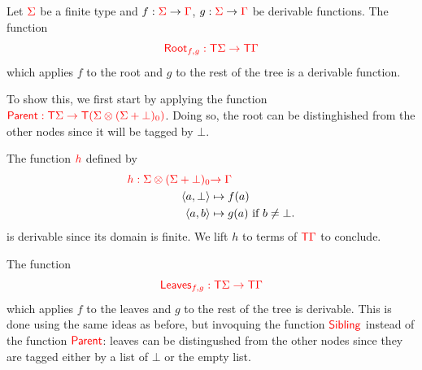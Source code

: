 \medskip
\noindent  \begin{example} Let ${\color{red}{\Sigma}}$ be a finite type and $f:{\color{red}{\Sigma}} \to {\color{red}{\Gamma}}$, $g: {\color{red}{\Sigma}} \to {\color{red}{\Gamma}}$ be derivable functions. The function $${\color{red}{\mathsf{Root}_{f,g} : {\color{red}{\mathsf T}}{\color{red}{\Sigma}}\to {\color{red}{\mathsf T}}{\color{red}{\Gamma}}}}$$
which applies $f$ to the root and $g$ to the rest of the tree is a derivable function.
 
To show this, we first start by applying the function ${\color{red}{\mathsf{Parent}:{\color{red}{\mathsf T}}{\color{red}{\Sigma}}\to{\color{red}{\mathsf T}}({\color{red}{\Sigma}}\otimes({\color{red}{\Sigma}}+\bot)_0)}}$. Doing so, the root can be distinghished from the other nodes since it will be tagged by $\bot$.  

The function ${\color{red}{h}}$ defined by 
\begin{align*}
{\color{red}{h:{\color{red}{\Sigma}}\otimes({\color{red}{\Sigma}}+\bot)_0}}&{\color{red}{\to {\color{red}{\Gamma}}}}\\
  \langle{a,\bot}\rangle &\mapsto f(a) \\
  \langle{a,b}\rangle &\mapsto g(a) \text{ if } b\neq \bot.
\end{align*}
is derivable since its domain is finite. 
We lift $h$ to terms of ${\color{red}{\mathsf T}}{\color{red}{\Gamma}}$ to conclude.



\medskip
The function $${\color{red}{\mathsf{Leaves}_{f,g} : {\color{red}{\mathsf T}}{\color{red}{\Sigma}}\to {\color{red}{\mathsf T}}{\color{red}{\Gamma}}}}$$
 which applies $f$ to the leaves and $g$ to the rest of the tree is derivable. This is done using the same ideas as before, but invoquing the function ${\color{red}{\mathsf{Sibling}}}$ instead of the function ${\color{red}{\mathsf{Parent}}}$: leaves can be distingushed from the other nodes since they are tagged either by a list of $\bot$ or the empty list.
\end{example}

